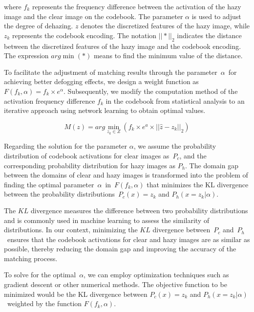 \documentclass[journal]{IEEEtran}
\begin{document}
\noindent where $f_{k}$ represents the frequency difference between the activation of the hazy image and the clear image on the codebook. The parameter $ \alpha $ is used to adjust the degree of dehazing. $z$ denotes the discretized features of the hazy image, while $z_{k}$ represents the codebook encoding. The notation $||*||_{2}$ indicates the distance between the discretized features of the hazy image and the codebook encoding. The expression $arg \min(*)$ means to find the minimum value of the distance.


To facilitate the adjustment of matching results through the parameter $\alpha$ for achieving better defogging effects, we design a weight function as $F(f_{k}, \alpha) = f_{k} \times e^{\alpha} $. Subsequently, we modify the computation method of the activation frequency difference $f_{k}$ in the codebook from statistical analysis to an iterative approach using network learning to obtain optimal values.

\begin{equation}
	\label{codebook_matching_equation_1}
	M(z) = arg \min_{z_{k} \in Z} (f_{k} \times e^{a} \times || \widehat{z} - z_{k} ||_{2})
\end{equation}

Regarding the solution for the parameter $\alpha$, we assume the probability distribution of codebook activations for clear images as $P_{c}$, and the corresponding probability distribution for hazy images as $P_{h}$. The domain gap between the domains of clear and hazy images is transformed into the problem of finding the optimal parameter $\alpha$ in $F(f_{k}, \alpha)$ that minimizes the KL divergence between the probability distributions $P_{c}(x) = z_{k}$ and $P_{h}(x = z_{k} | \alpha) $.


The $KL$ divergence measures the difference between two probability distributions and is commonly used in machine learning to assess the similarity of distributions. In our context, minimizing the $KL$ divergence between $P_{c}$ and $P_{h}$ ensures that the codebook activations for clear and hazy images are as similar as possible, thereby reducing the domain gap and improving the accuracy of the matching process.

To solve for the optimal $\alpha$, we can employ optimization techniques such as gradient descent or other numerical methods. The objective function to be minimized would be the KL divergence between $P_{c}(x) = z_{k}$ and $P_{h}(x = z_{k} | \alpha) $ weighted by  the function $F(f_{k}, \alpha)$.
\end{document}
